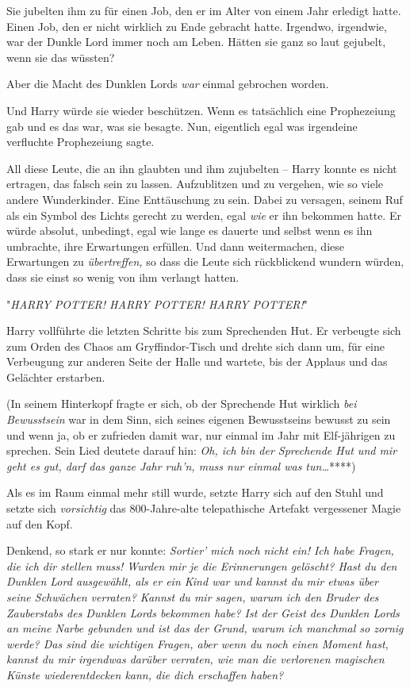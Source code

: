 {Sie jubelten ihm zu für einen Job, den er im Alter von einem Jahr erledigt hatte. Einen Job, den er nicht wirklich zu Ende gebracht hatte. Irgendwo, irgendwie, war der Dunkle Lord immer noch am Leben. Hätten sie ganz so laut gejubelt, wenn sie das wüssten?

Aber die Macht des Dunklen Lords \emph{war} einmal gebrochen worden.

Und Harry würde sie wieder beschützen. Wenn es tatsächlich eine Prophezeiung gab und es das war, was sie besagte. Nun, eigentlich egal was irgendeine verfluchte Prophezeiung sagte.

All diese Leute, die an ihn glaubten und ihm zujubelten -- Harry konnte es nicht ertragen, das falsch sein zu lassen. Aufzublitzen und zu vergehen, wie so viele andere Wunderkinder. Eine Enttäuschung zu sein. Dabei zu versagen, seinem Ruf als ein Symbol des Lichts gerecht zu werden, egal \emph{wie} er ihn bekommen hatte. Er würde absolut, unbedingt, egal wie lange es dauerte und selbst wenn es ihn umbrachte, ihre Erwartungen erfüllen. Und dann weitermachen, diese Erwartungen zu \emph{übertreffen,} so dass die Leute sich rückblickend wundern würden, dass sie einst so wenig von ihm verlangt hatten.

"\emph{HARRY POTTER! HARRY POTTER! HARRY POTTER!}"

Harry vollführte die letzten Schritte bis zum Sprechenden Hut. Er verbeugte sich zum Orden des Chaos am Gryffindor-Tisch und drehte sich dann um, für eine Verbeugung zur anderen Seite der Halle und wartete, bis der Applaus und das Gelächter erstarben.

(In seinem Hinterkopf fragte er sich, ob der Sprechende Hut wirklich \emph{bei Bewusstsein} war in dem Sinn, sich seines eigenen Bewusstseins bewusst zu sein und wenn ja, ob er zufrieden damit war, nur einmal im Jahr mit Elf-jährigen zu sprechen. Sein Lied deutete darauf hin: \emph{Oh, ich bin der Sprechende Hut und mir geht es gut, darf das ganze Jahr ruh'n, muss nur einmal was tun…}****)

Als es im Raum einmal mehr still wurde, setzte Harry sich auf den Stuhl und setzte sich \emph{vorsichtig} das 800-Jahre-alte telepathische Artefakt vergessener Magie auf den Kopf.

Denkend, so stark er nur konnte: \emph{Sortier' mich noch nicht ein! Ich habe Fragen, die ich dir stellen muss! Wurden mir je die Erinnerungen gelöscht? Hast du den Dunklen Lord ausgewählt, als er ein Kind war und kannst du mir etwas über seine Schwächen verraten? Kannst du mir sagen, warum ich den Bruder des Zauberstabs des Dunklen Lords bekommen habe? Ist der Geist des Dunklen Lords an meine Narbe gebunden und ist das der Grund, warum ich manchmal so zornig werde? Das sind die wichtigen Fragen, aber wenn du noch einen Moment hast, kannst du mir irgendwas darüber verraten, wie man die verlorenen magischen Künste wiederentdecken kann, die dich erschaffen haben?}

}
